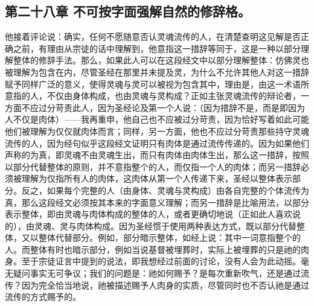 
\subsection{第二十八章 不可按字面强解自然的修辞格。}

他接着评论说：确实，任何不愿随意否认灵魂流传的人，在清楚查明这见解是否正确之前，有理由从宗徒的话中理解到，他意指这一措辞等同于，这是一种以部分理解整体的修辞手法。那么，如果此人可以在这段经文中以部分理解整体：仿佛灵也被理解为包含在内，尽管圣经在那里并未提及灵，为什么不允许其他人对这一措辞赋予同样广泛的意义，使得灵魂与灵可以被视为包含其中，理由是，由这一术语所意指的人，不仅由身体构成，也由灵魂与灵构成？正如主张灵魂流传的辩论者，一方面不应过分苛责此人，因为圣经论及第一个人说：（因为措辞不是，而是即因为人不仅是肉体）——我再重申，他自己也不应被过分苛责，因为恰好写着如此可能他们被理解为仅仅就肉体而言；同样，另一方面，他也不应过分苛责那些持守灵魂流传的人，因为经句似乎这段经文证明只有肉体是通过流传传递的。因为如果他们声称的为真，即灵魂不由灵魂生出，而只有肉体由肉体生出，那么这一措辞，按照以部分代替整体的原则，并不意指整个的人，而仅指一个人的肉体；而另一措辞必须被理解为仅指所有人的肉体，这肉体从第一个人传递下来，圣经以整体表示部分。反之，如果每个完整的人（由身体、灵魂与灵构成）由各自完整的个体流传为真，那么这段经文必须按其本来的字面意义理解；而另一措辞是比喻用法，以部分表示整体，即由灵魂与肉体构成的整体的人，或者更确切地说（正如此人喜欢说的），由灵魂、灵与肉体构成。因为圣经惯于使用两种表达方式，既以部分代替整体，又以整体代替部分。例如，部分暗示整体，如经上说：其中一词意指整个的人。而整体有时也暗示部分，例如当说基督被埋葬时，实际上被埋葬的只是祂的肉身。至于宗徒证言中提到的说法，即我想经过前面的讨论，没有人会为此动摇。毫无疑问事实无可争议；我们的问题是：祂如何赐予？是每次重新吹气，还是通过流传？因为完全恰当地说，祂被描述赐予人肉身的实质，尽管同时也不否认祂是通过流传的方式赐予的。\par

